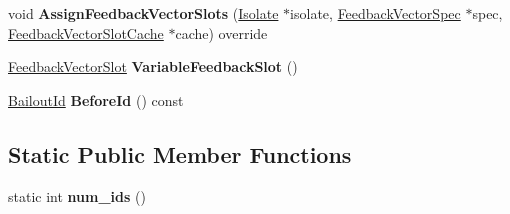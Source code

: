 \begin{DoxyCompactItemize}
\item 
void {\bfseries Assign\+Feedback\+Vector\+Slots} (\hyperlink{classv8_1_1internal_1_1_isolate}{Isolate} $\ast$isolate, \hyperlink{classv8_1_1internal_1_1_feedback_vector_spec}{Feedback\+Vector\+Spec} $\ast$spec, \hyperlink{classv8_1_1internal_1_1_feedback_vector_slot_cache}{Feedback\+Vector\+Slot\+Cache} $\ast$cache) override\hypertarget{classv8_1_1internal_1_1_variable_proxy_a23b30410c65b65c99ca40a54a3e6b98a}{}\label{classv8_1_1internal_1_1_variable_proxy_a23b30410c65b65c99ca40a54a3e6b98a}

\item 
\hyperlink{classv8_1_1internal_1_1_feedback_vector_slot}{Feedback\+Vector\+Slot} {\bfseries Variable\+Feedback\+Slot} ()\hypertarget{classv8_1_1internal_1_1_variable_proxy_a20f7087af0e0fe00fbc5b0b265e599cc}{}\label{classv8_1_1internal_1_1_variable_proxy_a20f7087af0e0fe00fbc5b0b265e599cc}

\item 
\hyperlink{classv8_1_1internal_1_1_bailout_id}{Bailout\+Id} {\bfseries Before\+Id} () const \hypertarget{classv8_1_1internal_1_1_variable_proxy_a2104054ff119841b2bcccf97b63799c4}{}\label{classv8_1_1internal_1_1_variable_proxy_a2104054ff119841b2bcccf97b63799c4}

\end{DoxyCompactItemize}
\subsection*{Static Public Member Functions}
\begin{DoxyCompactItemize}
\item 
static int {\bfseries num\+\_\+ids} ()\hypertarget{classv8_1_1internal_1_1_variable_proxy_a85291d060aa92de0b87f0d3221a5b347}{}\label{classv8_1_1internal_1_1_variable_proxy_a85291d060aa92de0b87f0d3221a5b347}

\end{DoxyCompactItemize}
